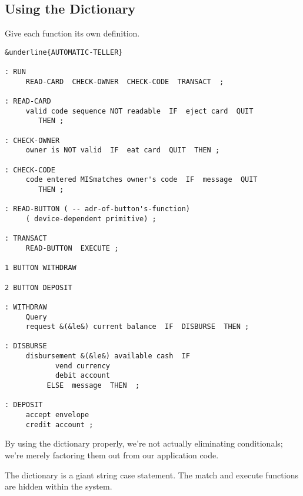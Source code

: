 \subsection{Using the Dictionary}

\begin{tip}
Give each function its own definition.
\end{tip}
\begin{figure*}[tttp]
\begin{center}
\small\begin{BVerbatim}[commandchars=\&\{\},baselinestretch=0.85]
&underline{AUTOMATIC-TELLER}

: RUN
     READ-CARD  CHECK-OWNER  CHECK-CODE  TRANSACT  ;

: READ-CARD
     valid code sequence NOT readable  IF  eject card  QUIT
        THEN ;

: CHECK-OWNER
     owner is NOT valid  IF  eat card  QUIT  THEN ;

: CHECK-CODE
     code entered MISmatches owner's code  IF  message  QUIT
        THEN ;

: READ-BUTTON ( -- adr-of-button's-function)
     ( device-dependent primitive) ;

: TRANSACT
     READ-BUTTON  EXECUTE ;

1 BUTTON WITHDRAW

2 BUTTON DEPOSIT

: WITHDRAW
     Query
     request &(&le&) current balance  IF  DISBURSE  THEN ;

: DISBURSE
     disbursement &(&le&) available cash  IF
            vend currency
            debit account
          ELSE  message  THEN  ;

: DEPOSIT
     accept envelope
     credit account ;
\end{BVerbatim}
\end{center}
\end{figure*}

By using the \Forth{} dictionary properly, we're not actually eliminating
conditionals; we're merely factoring them out from our application code.

The \Forth{} dictionary is a giant string case statement. The match and
execute functions are hidden within the \Forth{} system.

